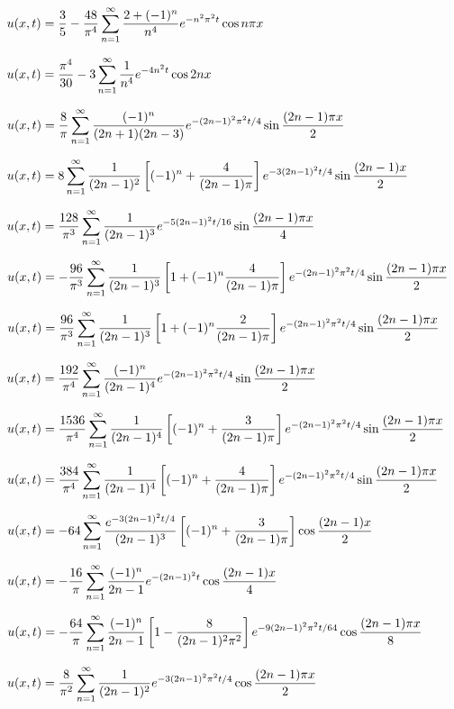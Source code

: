 $u(x,t)=\displaystyle\frac{3}{5}-\frac{48}{\pi^{4}}\sum_{n=1}^{\infty}\frac{2+(-1)^{n}}{n^{4}}e^{-n^{2}\pi^{2}t}\cos n\pi x$

$\displaystyle u(x,t)=\frac{\pi^{4}}{30}-3\sum_{n=1}^{\infty}\frac{1}{n^{4}}e^{-4n^{2}t}\cos2nx$

$u(x,t)=\displaystyle{\frac{8}{\pi}\sum^{\infty}_{n=1}
\frac{(-1)^{n}}{(2n+1)(2n-3)}e^{-(2n-1)^{2}\pi^{2}t/4}\sin\frac{(2n-1)\pi x}{2}}$

$u(x,t)=\displaystyle8\sum_{n=1}^{\infty}\frac{1}{(2n-1)^{2}}\left[
(-1)^{n}+\frac{4}{(2n-1)\pi}\right]e^{-3(2n-1)^{2}t/4}\sin\frac{(2n-1)x}{2}$

$u(x,t)=\displaystyle
\frac{128}{\pi^{3}}\sum_{n=1}^{\infty}\frac{1}{(2n-1)^{3}}e^{-5(2n-1)^{2}t/16}\sin\frac{(2n-1)\pi x}{4}$

$u(x,t)
=\displaystyle-\frac{96}{\pi^{3}}\sum_{n=1}^{\infty}
\frac{1}{(2n-1)^{3}}\left[1+(-1)^{n}\frac{4}{(2n-1)\pi}\right]
e^{-(2n-1)^{2}\pi^{2}t/4}\sin\frac{(2n-1)\pi x}{2}$

$u(x,t)
=\displaystyle\frac{96}{\pi^{3}}\sum_{n=1}^{\infty}
\frac{1}{(2n-1)^{3}}\left[1+(-1)^{n}\frac{2}{(2n-1)\pi}\right]
e^{-(2n-1)^{2}\pi^{2}t/4}\sin\frac{(2n-1)\pi x}{2}$

$u(x,t)=\displaystyle\frac{192}{\pi^{4}}\sum_{n=1}^{\infty}\frac{(-1)^{n}}{(2n-1)^{4}}
e^{-(2n-1)^{2}\pi^{2}t/4}\sin\frac{(2n-1)\pi x}{2}$

$u(x,t)=\displaystyle\frac{1536}{\pi^{4}}\sum_{n=1}^{\infty}\frac{1}{(2n-1)^{4}}
\left[(-1)^{n}+\frac{3}{(2n-1)\pi}\right]
e^{-(2n-1)^{2}\pi^{2}t/4}\sin\frac{(2n-1)\pi x}{2}$

$u(x,t)=\displaystyle\frac{384}{\pi^{4}}\sum_{n=1}^{\infty}\frac{1}{(2n-1)^{4}}
\left[(-1)^{n}+\frac{4}{(2n-1)\pi}\right]
e^{-(2n-1)^{2}\pi^{2}t/4}\sin\frac{(2n-1)\pi x}{2}$

$u(x,t)=-\displaystyle64\sum_{n=1}^{\infty}\frac{e^{-3(2n-1)^{2}t/4}}{(2n-1)^{3}}\left[
(-1)^{n}+\frac{3}{(2n-1)\pi}\right]\cos\frac{(2n-1)
x}{2}$

$u(x,t)=-\displaystyle\frac{16}{\pi}\sum^{\infty}_{n=1}
\frac{(-1)^{n}}{2n-1}e^{-(2n-1)^{2}t}\cos\frac{(2n-1)x}{4}$

$u(x,t)=\displaystyle-\frac{64}{\pi}\sum_{n=1}^{\infty}\frac{(-1)^{n}}{2n-1}\left[
1-\frac{8}{(2n-1)^{2}\pi^{2}}\right]e^{-9(2n-1)^{2}\pi^{2}t/64}\cos\frac{(2n-1)\pi
x}{8}$

$u(x,t)=
\displaystyle\frac{8}{\pi^{2}}\sum_{n=1}^{\infty}\frac{1}{(2n-1)^{2}}
e^{-3(2n-1)^{2}\pi^{2}t/4}
\cos\frac{(2n-1)\pi x}{2}$

